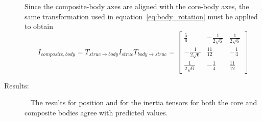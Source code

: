 \begin{description}
Since the composite-body axes are aligned with the core-body axes, the same 
transformation used in equation~\ref{eq:body_rotation} must be applied to 
obtain
 \begin{equation*}
I_{composite, body} = T_{struc \rightarrow body} I_{struc} T_{body \rightarrow 
struc} = 
 \begin{bmatrix} 
 \frac{5}{6} & -\frac{1}{2\sqrt{6}} & \frac{1}{2\sqrt{6}}  \\
 -\frac{1}{2\sqrt{6}} & \frac{11}{12} & -\frac{1}{4}   \\
 \frac{1}{2\sqrt{6}} & -\frac{1}{4} & \frac{11}{12} 
   \end{bmatrix}
\end{equation*}

\item[Results:]\ \newline
The results for position and for the inertia tensors for both the core and 
composite bodies agree with predicted values.

\end{description}






